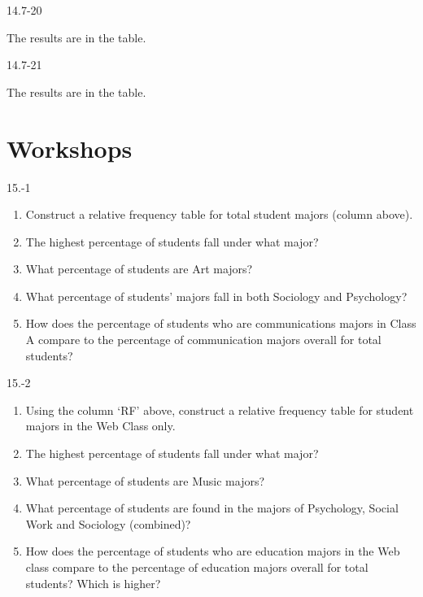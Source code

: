 \begin{exsol@solution}{14.7-20}

      The results are in the table.

\end{exsol@solution}
\begin{exsol@solution}{14.7-21}

  The results are in the table.


\end{exsol@solution}
\setcounter{chapter}{15}\chapter{Workshops}
\begin{exsol@solution}{15.-1}

  \begin{enumerate}
  \item Construct a relative frequency table for total student majors (column above).
  \item	The highest percentage of students fall under what major?
  \item	What percentage of students are Art majors?
  \item	What percentage of students’ majors fall in both Sociology and Psychology?
  \item	How does the percentage of students who are communications majors in Class A compare to the percentage of communication majors overall for total students?
\end{enumerate}
\end{exsol@solution}
\begin{exsol@solution}{15.-2}
  \begin{enumerate}
  \item	Using the column `RF' above, construct a relative frequency table for student majors in the Web Class only.
  \item	The highest percentage of students fall under what major?
  \item	What percentage of students are Music majors?
  \item	What percentage of students are found in the majors of Psychology, Social Work and Sociology (combined)?
  \item	How does the percentage of students who are education majors in the Web class compare to the percentage of education majors overall for total students?  Which is higher?
\end{enumerate}
\end{exsol@solution}
